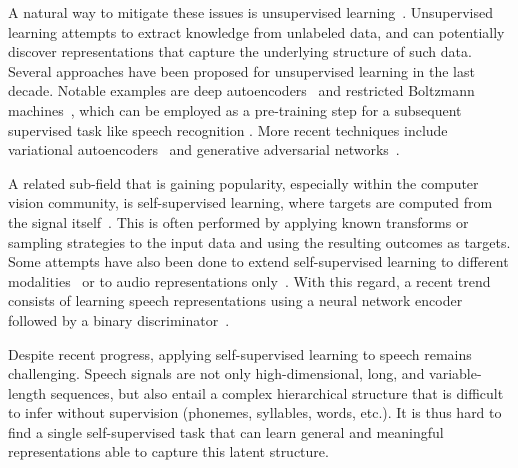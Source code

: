 \documentclass[a4paper]{article}
\begin{document}
A natural way to mitigate these issues is unsupervised learning~\cite{Bengio_2012}. Unsupervised learning attempts to extract knowledge from unlabeled data, and can potentially discover representations that capture the underlying structure of such data. Several approaches have been proposed for unsupervised learning in the last decade. Notable examples are deep autoencoders~\cite{deep_autoencoder_1} and restricted Boltzmann machines~\cite{IEEEexample:rbm1}, which can be employed as a pre-training step for a subsequent supervised task like speech recognition \cite{IEEEexample:intro1}. More recent techniques include variational autoencoders~\cite{var_auto} and generative adversarial networks~\cite{gan}. 

A related sub-field that is gaining popularity, especially within the computer vision community, is self-supervised learning, where targets are computed from the signal itself~\cite{multi_task_self_sup,self_sup2,self_sup3}. This is often performed by applying known transforms or sampling strategies to the input data and using the resulting outcomes as targets. Some attempts have also been done to extend self-supervised learning to different modalities~\cite{self_sup_audio_visual,self_sup_audio_visual2} or to audio representations only~\cite{self_sup_audio,Chorowsky_2019,cpc_deepmind,ravanelli2018learning}. With this regard, a recent trend consists of learning speech representations using a neural network encoder followed by a binary discriminator~\cite{cpc_deepmind,hjelm2018learning,ravanelli2018learning}. 

Despite recent progress, applying self-supervised learning to speech remains challenging. Speech signals are not only high-dimensional, long, and variable-length sequences, but also entail a complex hierarchical structure that is difficult to infer without supervision (phonemes, syllables, words, etc.). It is thus hard to find a single self-supervised task that can learn general and meaningful representations able to capture this latent structure.
\end{document}
